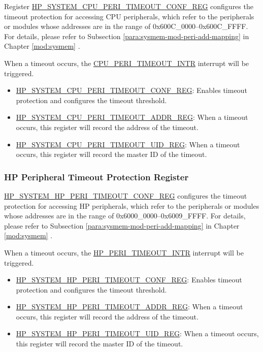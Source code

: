 \documentclass[main\_\_EN.tex]{subfiles}
\begin{document}
Register \hyperref[regdesc:HPSYSTEMCPUPERITIMEOUTCONFREG]{HP\_SYSTEM\_CPU\_PERI\_TIMEOUT\_CONF\_REG} configures the timeout protection for accessing CPU peripherals, which refer to the peripherals or modules whose addresses are in the range of 0x600C\_0000–0x600C\_FFFF. For details, please refer to Subsection \ref{para:sysmem-mod-peri-add-mapping} \textit{} in Chapter \ref{mod:sysmem} \textit{}.


When a timeout occurs, the \hyperref[tab:peripheral-interrupt-config-status-source]{CPU\_PERI\_TIMEOUT\_INTR} interrupt will be triggered.

\begin{itemize}
    \item \hyperref[regdesc:HPSYSTEMCPUPERITIMEOUTCONFREG]{HP\_SYSTEM\_CPU\_PERI\_TIMEOUT\_CONF\_REG}: Enables timeout protection and configures the timeout threshold.
    \item \hyperref[regdesc:HPSYSTEMCPUPERITIMEOUTADDRREG]{HP\_SYSTEM\_CPU\_PERI\_TIMEOUT\_ADDR\_REG}: When a timeout occurs, this register will record the address of the timeout.
    \item \hyperref[regdesc:HPSYSTEMCPUPERITIMEOUTUIDREG]{HP\_SYSTEM\_CPU\_PERI\_TIMEOUT\_UID\_REG}: When a timeout occurs, this register will record the master ID of the timeout.
\end{itemize}


\subsubsection{HP Peripheral Timeout Protection Register}

\hyperref[regdesc:HPSYSTEMHPPERITIMEOUTCONFREG]{HP\_SYSTEM\_HP\_PERI\_TIMEOUT\_CONF\_REG} configures the timeout protection for accessing HP peripherals, which refer to the peripherals or modules whose addresses are in the range of 0x6000\_0000–0x6009\_FFFF. For details, please refer to Subsection \ref{para:sysmem-mod-peri-add-mapping} \textit{} in Chapter \ref{mod:sysmem} \textit{}.

When a timeout occurs, the \hyperref[tab:peripheral-interrupt-config-status-source]{HP\_PERI\_TIMEOUT\_INTR} interrupt will be triggered.

\begin{itemize}
    \item \hyperref[regdesc:HPSYSTEMHPPERITIMEOUTCONFREG]{HP\_SYSTEM\_HP\_PERI\_TIMEOUT\_CONF\_REG}: Enables timeout protection and configures the timeout threshold.
    \item \hyperref[regdesc:HPSYSTEMHPPERITIMEOUTADDRREG]{HP\_SYSTEM\_HP\_PERI\_TIMEOUT\_ADDR\_REG}: When a timeout occurs, this register will record the address of the timeout.
    \item \hyperref[regdesc:HPSYSTEMHPPERITIMEOUTUIDREG]{HP\_SYSTEM\_HP\_PERI\_TIMEOUT\_UID\_REG}: When a timeout occurs, this register will record the master ID of the timeout.
\end{itemize}
\end{document}
